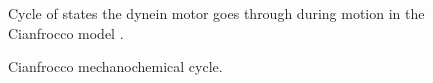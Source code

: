 \documentclass[
11pt, %
english, %
singlespacing, %
headsepline, %
chapterinoneline, %
]{MastersDoctoralThesis} %
\begin{document}
\begin{figure}[h!]
  \caption{Cianfrocco mechanochemical cycle.}{Cycle of states the dynein motor goes through during motion in the Cianfrocco model \cite{cianfroccoreview}.}
  \label{mech-cycle}
\end{figure}
\end{document}
